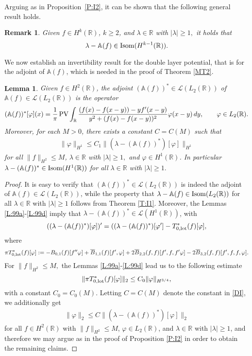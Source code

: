 \documentclass[11pt,reqno]{amsart}
\numberwithin{equation}{section}
\newcommand{\PV}{\mathop{\rm PV}\nolimits}
\newcommand{\0}{\Omega}
\newcommand{\ov}{\overline}
\newcommand{\bA}{\mathbb{A}}
\newcommand{\kL}{\mathcal{L}}
\newcommand{\R}{\mathbb{R}}
\newtheorem{lemma}[thm]{Lemma}
\newtheorem{rem}[thm]{Remark}
\numberwithin{equation}{section}
\begin{document}
Arguing as in Proposition~\ref{P:I2}, it can be shown  that the following general result holds.
\begin{rem}\label{R:IR} 
Given  $f\in H^k(\R)$, $k\geq 2$,  and $\lambda\in\R$ with $|\lambda|\geq 1,$  it holds   that
\begin{align*} 
 \lambda-\bA(f)\in {\rm Isom}(H^{k-1}(\R)).
\end{align*}
\end{rem}
 
 We now establish an invertibility  result for the double layer potential, that is for the adjoint of $\bA(f)$, which is needed in the proof of Theorem \ref{MT2}. 
 
 \begin{lemma}\label{L:99f}
 Given  $f\in H^2(\R)$, the adjoint $(\bA(f))^*\in\kL(L_2(\R))$ of  $\bA(f)\in\kL(L_2(\R))$ is the operator
 \[
(\bA(f))^*[\varphi](x)=\frac{1}{\pi}\PV\int_\R\frac{(f(x)-f(x-y))-yf'(x-y)}{y^2+(f(x)-f(x-y))^2}\varphi(x-y)\, dy, \qquad \varphi\in L_2(\R).
\]
Moreover, for each $M>0$, there exists a constant $C=C(M)$ such that 
 \begin{align}\label{FE2}
  \|\varphi\|_{H^1}\leq C_1\|(\lambda-(\bA(f))^*)[\varphi]\|_{H^1}
 \end{align}
 for all $\|f\|_{H^2}\leq M$, $\lambda\in\R$ with $|\lambda|\geq 1,$  and $\varphi\in H^1(\R)$.
 In particular $\lambda-(\bA(f))^*\in {\rm Isom}(H^1(\R))$ for all $\lambda\in\R$ with $|\lambda|\geq 1.$  
\end{lemma}
\begin{proof}
 It is easy to verify that $  (\bA(f))^*\in\kL(L_2(\R))$ is indeed the adjoint of $\bA(f)\in\kL(L_2(\R))$, while the property that $\lambda-\bA(f)\in {\rm Isom}(L_2(\R))$ for all $\lambda\in\R$ with $|\lambda|\geq 1$ follows from Theorem \ref{T:I1}.
  Moreover, the Lemmas \ref{L:99a}-\ref{L:99d} imply that   $\lambda- (\bA(f))^*\in\kL(H^1(\R))$, with
 \[
 ((\lambda- (\bA(f))^*)[\varphi])'=((\lambda- (\bA(f))^*)[\varphi']-T_{0,\rm lot}^*(f)[\varphi],
 \]
 where
 \begin{align*}
 \pi T_{0,\rm lot}^*(f)[\varphi]:=-B_{0,1}(f)[f''\varphi]+\ov B_{1,1}(f)[f',\varphi]+ 2\ov B_{2,2}(f,f)[f',f,f'\varphi]- 2\ov B_{3,2}(f,f)[f',f,f,\varphi].
 \end{align*}
For $\|f\|_{H^2}\leq M,$  the Lemmas \ref{L:99a}-\ref{L:99d} lead us to the following estimate
\begin{align*}
 \|\pi T_{0,\rm lot}^*(f)[\varphi]\|_2\leq C_0\|\varphi\|_{H^{3/4}},
 \end{align*}
 with a constant $C_0=C_0(M)$. 
 Letting $C=C(M)$ denote the constant in  \eqref{DI}, we additionally get  
 \begin{align*}
\|\varphi\|_{2}\leq C\|(\lambda-(\bA(f))^*)[\varphi]\|_2 
\end{align*}
 for all $f\in H^2(\R)$ with $\|f\|_{H^2}\leq M$,  $\varphi\in L_2(\R)$, and $\lambda\in\R$ with $|\lambda|\geq1$,   and therefore we may argue as in the proof of Proposition \ref{P:I2}
 in order to obtain the remaining claims.
\end{proof}
\end{document}
